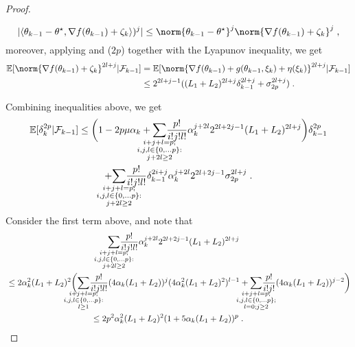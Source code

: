 \begin{proof}
\begin{enumerate}
    \begin{equation}
        |\langle\theta_{k-1}-\thetas, \nabla f(\theta_{k-1})+\zeta_k\rangle)^j| \leq \norm{\theta_{k-1}-\thetas}^j\norm{\nabla f(\theta_{k-1})+\zeta_k}^j\eqsp,
    \end{equation}
    moreover, applying  and ($2p$) together with the Lyapunov inequality, we get 
    \begin{align}
        \PE[\norm{\nabla f(\theta_{k-1})+\zeta_k}^{2l+j}|\F_{k-1}] 
        &= \PE[\norm{\nabla f(\theta_{k-1})+g(\theta_{k-1}, \xi_k) + \eta(\xi_k)}^{2l+j}|\F_{k-1}] \\
        &\leq 2^{2l+j-1}((L_1+L_2)^{2l+j}\delta_{k-1}^{2l+j} + \sigma_{2p}^{2l+j})\eqsp. 
    \end{align}
\end{enumerate}
    Combining inequalities above, we get 
    \begin{multline}
    \label{eq:delta_k_2p_decomposition}
        \PE[\delta_k^{2p}|\F_{k-1}]\leq \biggl(1 -2p\mu\alpha_k + \underset{\mathclap{\substack{i+j+l=p;\\ i,j,l \in \{0,\ldots p\}: \\j+2l\geq 2 }}} {\sum}\frac{p!}{i!j!l!}\alpha_k^{j+2l}2^{2l+2j-1}(L_1+L_2)^{2l+j}\biggr) \delta_{k-1}^{2p} \\  + \underset{\mathclap{\substack{i+j+l=p;\\ i,j,l \in \{0,\ldots p\}: \\j+2l\geq 2 }}} {\sum}\frac{p!}{i!j!l!}\delta_{k-1}^{2i+j}\alpha_k^{j+2l}2^{2l+2j-1}\sigma_{2p}^{2l+j}\eqsp.
    \end{multline}
    Consider the first term above, and note that
    \begin{align}
    \label{eq:bound_sum_j_2l_p_moment}
    &\qquad \qquad\qquad \qquad \qquad \qquad\underset{\mathclap{\substack{i+j+l=p;\\ i,j,l \in \{0,\ldots p\}: \\j+2l\geq 2 }}} {\sum}\frac{p!}{i!j!l!}\alpha_k^{j+2l}2^{2l+2j-1}(L_1+L_2)^{2l+j} 
     \\ 
    &\leq 2 \alpha_k^2 (L_1+L_2)^2 \biggl(\underset{\mathclap{\substack{i+j+l=p;\\ i,j,l \in \{0,\ldots p\}: \\l\geq 1 }}} {\sum}\frac{p!}{i!j!l!}(4\alpha_k(L_1+L_2))^j(4\alpha_k^2(L_1+L_2)^2)^{l-1} + \underset{\mathclap{\substack{i+j+l=p;\\ i,j,l \in \{0,\ldots p\};\\l=0;j\geq2 }}} {\sum}\frac{p!}{i!j!}(4\alpha_k(L_1+L_2))^{j-2}\biggr) \\& \qquad \qquad\qquad \qquad \qquad \leq 2 p^2\alpha_k^2 (L_1+L_2)^2(1+5\alpha_k(L_1+L_2))^{p} \eqsp.

\end{align}
\end{proof}
